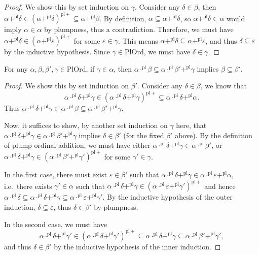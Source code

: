 \documentclass[12pt,openany]{book}
\theoremstyle{plain}
\theoremstyle{definition}
\newcommand\PlOrd{\mathrm{PlOrd}}
\newcommand\pl{\mathrm{pl}}
\newcommand\pls{{\pl +}}
\begin{document}
\begin{proof}
  We show this by set induction on $\gamma$. Consider any $\delta \in \beta$, then $\alpha +^\pl \delta \in \left(\alpha +^\pl \delta\right)^\pls \subseteq \alpha +^\pl \beta$. By definition, $\alpha \subseteq \alpha +^\pl \delta$, so $\alpha +^\pl \delta \in \alpha$ would imply $\alpha \in \alpha$ by plumpness, thus a contradiction. Therefore, we must have $\alpha +^\pl \delta \in \left(\alpha +^\pl \varepsilon\right)^\pls$ for some $\varepsilon \in \gamma$. This means $\alpha +^\pl \delta \subseteq \alpha +^\pl \varepsilon$, and thus $\delta \subseteq \varepsilon$ by the inductive hypothesis. Since $\gamma \in \PlOrd$, we must have $\delta \in \gamma$.
\end{proof}

\begin{lemma}
  \label{lem:pl-mul-inj}
  For any $\alpha, \beta, \beta', \gamma \in \PlOrd$, if $\gamma \in \alpha$, then $\alpha \cdot^\pl \beta \subseteq \alpha \cdot^\pl \beta' +^\pl \gamma$ implies $\beta \subseteq \beta'$.
\end{lemma}

\begin{proof}
  We show this by set induction on $\beta'$. Consider any $\delta \in \beta$, we know that
  \[\alpha \cdot^\pl \delta +^\pl \gamma \in \left(\alpha \cdot^\pl \delta +^\pl \gamma\right)^\pls \subseteq \alpha \cdot^\pl \delta +^\pl \alpha.\]
  Thus $\alpha \cdot^\pl \delta +^\pl \gamma \in \alpha \cdot^\pl \beta \subseteq \alpha \cdot^\pl \beta' +^\pl \gamma$.

  Now, it suffices to show, by another set induction on $\gamma$ here, that $\alpha \cdot^\pl \delta +^\pl \gamma \in \alpha \cdot^\pl \beta' +^\pl \gamma$ implies $\delta \in \beta'$ (for the fixed $\beta'$ above). By the definition of plump ordinal addition, we must have either $\alpha \cdot^\pl \delta +^\pl \gamma \in \alpha \cdot^\pl \beta'$, or $\alpha \cdot^\pl \delta +^\pl \gamma \in \left(\alpha \cdot^\pl \beta' +^\pl \gamma'\right)^\pls$ for some $\gamma' \in \gamma$.

  In the first case, there must exist $\varepsilon \in \beta'$ such that $\alpha \cdot^\pl \delta +^\pl \gamma \in \alpha \cdot^\pl \varepsilon +^\pl \alpha$, i.e.\ there exists $\gamma' \in \alpha$ such that $\alpha \cdot^\pl \delta +^\pl \gamma \in \left(\alpha \cdot^\pl \varepsilon +^\pl \gamma'\right)^\pls$ and hence $\alpha \cdot^\pl \delta \subseteq \alpha \cdot^\pl \delta +^\pl \gamma \subseteq \alpha \cdot^\pl \varepsilon +^\pl \gamma'$. By the inductive hypothesis of the outer induction, $\delta \subseteq \varepsilon$, thus $\delta \in \beta'$ by plumpness.

  In the second case, we must have
  \[\alpha \cdot^\pl \delta +^\pl \gamma' \in \left(\alpha \cdot^\pl \delta +^\pl \gamma'\right)^\pls \subseteq \alpha \cdot^\pl \delta +^\pl \gamma \subseteq \alpha \cdot^\pl \beta' +^\pl \gamma',\]
  and thus $\delta \in \beta'$ by the inductive hypothesis of the inner induction.
\end{proof}
\end{document}
